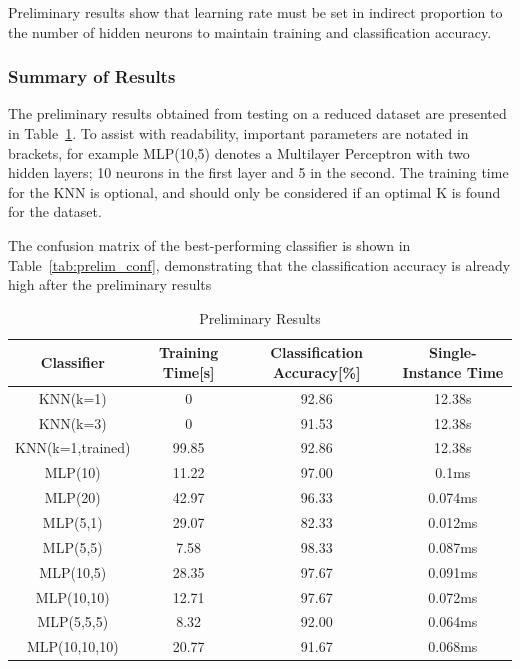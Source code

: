 Preliminary results show that learning rate must be set in indirect proportion to the number of hidden neurons to maintain training and classification accuracy.

\subsubsection{Summary of Results}
The preliminary results obtained from testing on a reduced dataset are presented in Table~\ref{tab:prelim_results}. To assist with readability, important parameters are notated in brackets, for example MLP(10,5) denotes a Multilayer Perceptron with two hidden layers; 10 neurons in the first layer and 5 in the second. The training time for the KNN is optional, and should only be considered if an optimal K is found for the dataset.

The confusion matrix of the best-performing classifier is shown in Table~\ref{tab:prelim_conf}, demonstrating that the classification accuracy is already high after the preliminary results

\begin{table}
	\centering
	\begin{tabular}{|c|c|c|c|}
	
		\hline
		\textbf{Classifier} & \textbf{Training Time[s]} & \textbf{Classification Accuracy[\%]} & \textbf{Single-Instance Time} \\
		\hline
		KNN(k=1)		 & 0	  & 92.86 & 12.38s  \\ \hline
		KNN(k=3)		 & 0	  & 91.53 & 12.38s  \\ \hline
		KNN(k=1,trained) & 99.85  & 92.86 & 12.38s  \\ \hline
		MLP(10) 	     & 11.22  & 97.00 & 0.1ms   \\ \hline
		MLP(20) 	     & 42.97  & 96.33 & 0.074ms \\ \hline
		MLP(5,1)	     & 29.07  & 82.33 & 0.012ms \\ \hline
		MLP(5,5)	     & 7.58   & 98.33 & 0.087ms \\ \hline
		MLP(10,5)	     & 28.35  & 97.67 & 0.091ms \\ \hline
		MLP(10,10)       & 12.71  & 97.67 & 0.072ms \\ \hline
		MLP(5,5,5) 	     & 8.32   & 92.00 & 0.064ms \\ \hline
		MLP(10,10,10)    & 20.77  & 91.67 & 0.068ms \\ \hline
	
	\end{tabular}
	\caption{Preliminary Results}
	\label{tab:prelim_results}
	\centering
\end{table}

